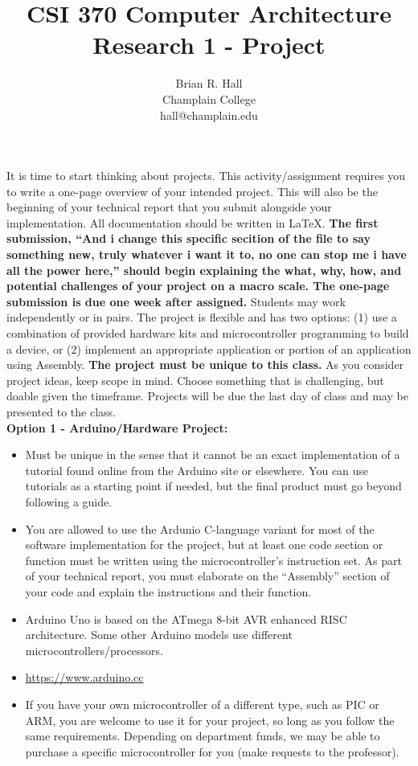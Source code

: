 \documentclass[twoside]{article}
\date{}
\begin{document}
\title{CSI 370 Computer Architecture \\ Research 1 - Project}
\author{Brian R. Hall \\
Champlain College\\
hall@champlain.edu}
\maketitle
\renewcommand{\labelitemi}{$\diamond$}
\noindent It is time to start thinking about projects. This activity/assignment
requires you to write a one-page overview of your intended project. This will also
be the beginning of your technical report that you submit alongside your
implementation. All documentation should be written in {\LaTeX}. \textbf{The first
submission, ``And i change this specific secition of the file to say something new, truly whatever i want it to, no one can stop me i have all the power here,'' should begin explaining the what, why, how, and
potential challenges of your project on a macro scale. The one-page submission is
due one week after assigned.}
Students may work independently or in pairs. The project is flexible and has two
options: (1) use a combination of provided hardware kits and microcontroller
programming to build a device, or (2) implement an appropriate application or
portion of an application using Assembly. \textbf{The project must be unique to
this class.}
As you consider project ideas, keep scope in mind. Choose something that is
challenging, but doable given the timeframe. Projects will be due the last day of
class and may be presented to the class. \\
\textbf{Option 1 - Arduino/Hardware Project:}
\begin{itemize}
\item Must be unique in the sense that it cannot be an exact implementation
of a tutorial found online from the Arduino site or elsewhere. You can use
tutorials as a starting point if needed, but the final product must go beyond
following a guide.
\item You are allowed to use the Ardunio C-language variant for most of the
software implementation for the project, but at least one code section or function
must be written using the microcontroller's instruction set. As part of your
technical report, you must elaborate on the ``Assembly'' section of your code and explain the instructions and their function.
\item Arduino Uno is based on the ATmega 8-bit AVR enhanced RISC
architecture. Some other Arduino models use different microcontrollers/processors.
\item \url{https://www.arduino.cc}
\item If you have your own microcontroller of a different type, such as PIC
or ARM, you are welcome to use it for your project, so long as you follow the same
requirements. Depending on department funds, we may be able to purchase a specific
microcontroller for you (make requests to the professor).
\end{itemize}
\end{document}
